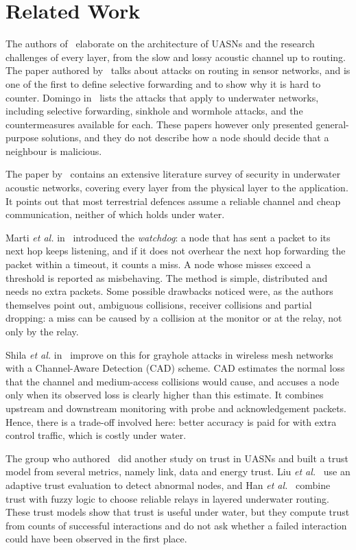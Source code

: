 \documentclass[conference]{IEEEtran}
\begin{document}
\section{Related Work}\label{sec:related}
The authors of~\cite{akyildiz} elaborate on the architecture of UASNs and the research challenges of every layer, from the slow and lossy acoustic channel up to routing. The paper authored by~\cite{karlof} talks about attacks on routing in sensor networks, and is one of the first to define selective forwarding and to show why it is hard to counter. Domingo in~\cite{domingo} lists the attacks that apply to underwater networks, including selective forwarding, sinkhole and wormhole attacks, and the countermeasures available for each. These papers however only presented general-purpose solutions, and they do not describe how a node should decide that a neighbour is malicious.

The paper by~\cite{jiang} contains an extensive literature survey of security in underwater acoustic networks, covering every layer from the physical layer to the application. It points out that most terrestrial defences assume a reliable channel and cheap communication, neither of which holds under water.

Marti \emph{et al.} in~\cite{marti} introduced the \emph{watchdog}: a node that has sent a packet to its next hop keeps listening, and if it does not overhear the next hop forwarding the packet within a timeout, it counts a miss. A node whose misses exceed a threshold is reported as misbehaving. The method is simple, distributed and needs no extra packets. Some possible drawbacks noticed were, as the authors themselves point out, ambiguous collisions, receiver collisions and partial dropping: a miss can be caused by a collision at the monitor or at the relay, not only by the relay.

Shila \emph{et al.} in~\cite{shila} improve on this for grayhole attacks in wireless mesh networks with a Channel-Aware Detection (CAD) scheme. CAD estimates the normal loss that the channel and medium-access collisions would cause, and accuses a node only when its observed loss is clearly higher than this estimate. It combines upstream and downstream monitoring with probe and acknowledgement packets. Hence, there is a trade-off involved here: better accuracy is paid for with extra control traffic, which is costly under water.

The group who authored~\cite{hanTrust} did another study on trust in UASNs and built a trust model from several metrics, namely link, data and energy trust. Liu \emph{et al.}~\cite{liu} use an adaptive trust evaluation to detect abnormal nodes, and Han \emph{et al.}~\cite{hanRouting} combine trust with fuzzy logic to choose reliable relays in layered underwater routing. These trust models show that trust is useful under water, but they compute trust from counts of successful interactions and do not ask whether a failed interaction could have been observed in the first place.
\end{document}
